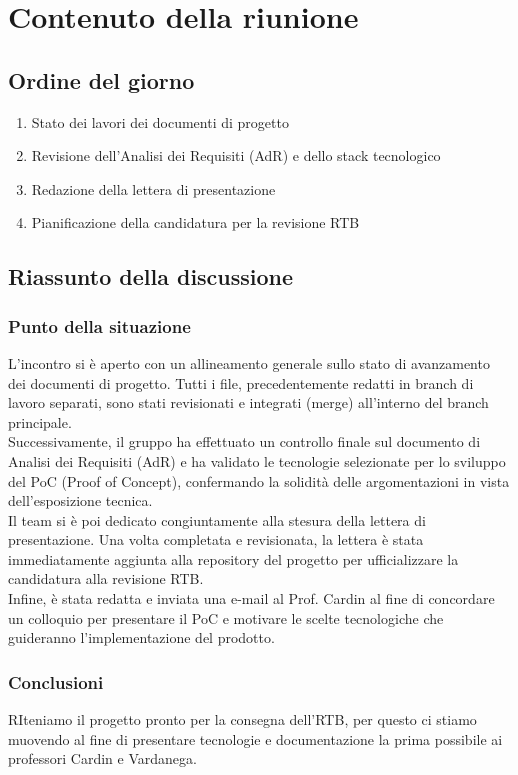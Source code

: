 \documentclass[a4paper, 11pt]{article}
\begin{document}
\section{Contenuto della riunione}

\subsection{Ordine del giorno}
\begin{enumerate}
    \item Stato dei lavori dei documenti di progetto
    \item Revisione dell'Analisi dei Requisiti (AdR) e dello stack tecnologico
    \item Redazione della lettera di presentazione
    \item Pianificazione della candidatura per la revisione RTB
\end{enumerate}

\newpage

\subsection{Riassunto della discussione}
\subsubsection{Punto della situazione}
L'incontro si è aperto con un allineamento generale sullo stato di avanzamento dei documenti di progetto. Tutti i file, precedentemente redatti in branch di lavoro separati, sono stati revisionati e integrati (merge) all'interno del branch principale.
\\
Successivamente, il gruppo ha effettuato un controllo finale sul documento di Analisi dei Requisiti (AdR) e ha validato le tecnologie selezionate per lo sviluppo del PoC (Proof of Concept), confermando la solidità delle argomentazioni in vista dell'esposizione tecnica.
\\
Il team si è poi dedicato congiuntamente alla stesura della lettera di presentazione. Una volta completata e revisionata, la lettera è stata immediatamente aggiunta alla repository del progetto per ufficializzare la candidatura alla revisione RTB.
\\
Infine, è stata redatta e inviata una e-mail al Prof. Cardin al fine di concordare un colloquio per presentare il PoC e motivare le scelte tecnologiche che guideranno l'implementazione del prodotto.
\subsubsection{Conclusioni}
RIteniamo il progetto pronto per la consegna dell'RTB, per questo ci stiamo muovendo al fine di presentare tecnologie e documentazione la prima possibile ai professori Cardin e Vardanega.\\
\end{document}
